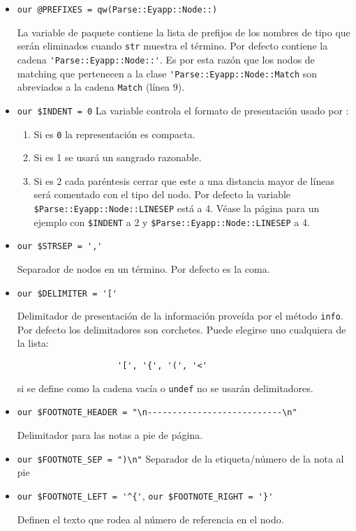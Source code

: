 \begin{itemize}
\item \verb|our @PREFIXES = qw(Parse::Eyapp::Node::)|

La variable de paquete  contiene
la lista de prefijos de los nombres de tipo que serán eliminados
cuando \verb|str| muestra el término. Por defecto contiene 
la cadena \verb|'Parse::Eyapp::Node::'|. Es por esta razón
que los nodos de matching que pertenecen a la clase \verb|'Parse::Eyapp::Node::Match|
son abreviados a la cadena \verb|Match| (línea 9).

\item \verb|our $INDENT = 0|
La variable  controla el formato de presentación
usado por :
\begin{enumerate}
\item
Si es \verb|0| la representación es compacta.
\item
Si es 1 se usará un sangrado razonable. 
\item
Si es 2 cada paréntesis cerrar que este a una distancia 
mayor de  líneas será comentado con el tipo del nodo. 
Por defecto la variable \verb|$Parse::Eyapp::Node::LINESEP| está a 4.
Véase la página 
\pageref{code:indent2}
para un ejemplo con \verb|$INDENT| a 2 y 
\verb|$Parse::Eyapp::Node::LINESEP| a 4.
\end{enumerate}

\item \verb|our $STRSEP = ','|

Separador de nodos en un término. Por defecto es la coma.

\item \verb|our $DELIMITER = '['|

Delimitador de presentación de la información proveída por el método
\verb|info|. Por defecto los delimitadores son corchetes. Puede elegirse 
uno cualquiera de  la lista:
\begin{verbatim}
                    '[', '{', '(', '<'
\end{verbatim}
si se define como la cadena vacía o \verb|undef| no se usarán delimitadores.

\item \verb|our $FOOTNOTE_HEADER = "\n---------------------------\n"|

Delimitador para las notas a pie de página.

\item \verb|our $FOOTNOTE_SEP = ")\n"|
Separador de la etiqueta/número de la nota al pie

\item \verb|our $FOOTNOTE_LEFT = '^{'|, \verb|our $FOOTNOTE_RIGHT = '}'|

Definen el texto que rodea al número de referencia en el nodo.


\end{itemize}

